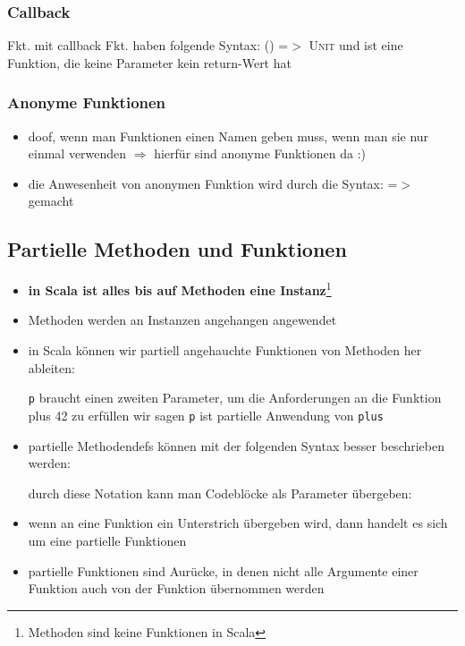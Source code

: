 \subsubsection{Callback}
Fkt. mit callback Fkt. haben folgende Syntax: 
  \textsc{() =$>$ Unit} und ist eine Funktion, die keine Parameter \und 
  kein return-Wert hat
  
  


\subsubsection{Anonyme Funktionen}
\begin{itemize}
  \item doof, wenn man Funktionen einen Namen geben muss, wenn man sie
  nur einmal verwenden $\Rightarrow$ hierfür sind anonyme Funktionen da :)
  \item die Anwesenheit von anonymen Funktion wird durch die Syntax:
  \textsc{=$>$} gemacht
  
  
\end{itemize}


\subsection{Partielle Methoden und Funktionen}
\begin{itemize}
  \item \textbf{in Scala ist alles bis auf Methoden eine 
  Instanz}\footnote{Methoden sind keine Funktionen in Scala}
  \item Methoden werden an Instanzen angehangen \und angewendet
  \item in Scala können wir partiell angehauchte Funktionen von Methoden
  her ableiten:
  
  
  
  \texttt{p} braucht einen zweiten Parameter, um die Anforderungen an
  die Funktion plus 42 zu erfüllen \und wir sagen \texttt{p} ist
  partielle Anwendung von \texttt{plus}
  
  \item partielle Methodendefs können mit der folgenden Syntax besser
  beschrieben werden:
  
  
  
  
  durch diese Notation kann man Codeblöcke als Parameter übergeben:
  
  
  
    \item wenn an eine Funktion ein Unterstrich übergeben wird, dann handelt
  es sich um eine partielle Funktionen
  \item partielle Funktionen sind Aurücke, in denen nicht alle Argumente 
  einer Funktion auch von der Funktion übernommen werden
  
    

\end{itemize}


